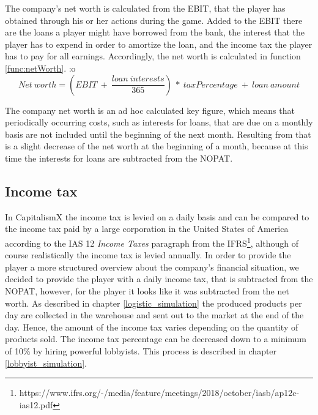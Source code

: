 The company’s net worth %
is calculated from the EBIT, that the player has obtained through his or her actions during the game. Added to the EBIT there are the loans a player might have borrowed from the bank, the interest that the player has to expend in order to amortize the loan, and the income tax the player has to pay for all earnings. Accordingly, the net worth is calculated in  function \ref{func:netWorth}.
:o
\begin{equation}
\label{func:netWorth}
    Net~worth = (EBIT~+~\frac{loan~interests}{365})~*~taxPercentage~+~loan~amount
\end{equation}


The company net worth is an ad hoc calculated key figure, which means that periodically occurring costs, such as interests for loans, that are due on a monthly basis are not included until the beginning of the next month. Resulting from that is a slight decrease of the net worth at the beginning of a month, because at this time the interests for loans are subtracted from the NOPAT.
 
\subsection{Income tax}

In CapitalismX the income tax is levied on a daily basis and can be compared to the income tax paid by a large corporation in the United States of America according to the IAS 12 \textit{Income Taxes} paragraph from the IFRS\footnote{https://www.ifrs.org/-/media/feature/meetings/2018/october/iasb/ap12c-ias12.pdf}, although of course realistically the income tax is levied annually. In order to provide the player a more structured overview about the company’s financial situation, we decided to provide the player with a daily income tax, that is subtracted from the NOPAT, however, for the player it looks like it was subtracted from the net worth. As described in chapter \ref{logistic_simulation} the produced products per day are collected in the warehouse and sent out to the market at the end of the day. Hence, the amount of the income tax varies depending on the quantity of products sold. The income tax percentage can be decreased down to a minimum of 10\% by hiring powerful lobbyists. This process is described in chapter \ref{lobbyist_simulation}.

